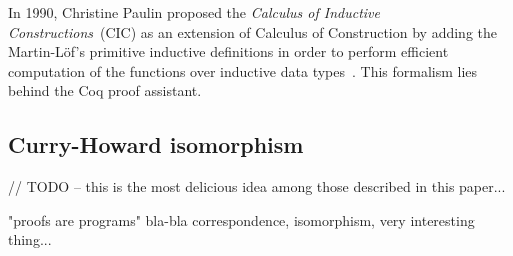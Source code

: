 \documentclass[article]{aaltoseries}
\begin{document}
In 1990, Christine Paulin proposed the \textit{Calculus of Inductive Constructions}~(CIC) as an extension of Calculus of Construction by adding the Martin-Löf's primitive inductive definitions in order to perform efficient computation of the functions over inductive data types~\cite{Pau2015}. This formalism lies behind the Coq proof assistant.



\subsection{Curry-Howard isomorphism}
// TODO -- this is the most delicious idea among those described in this paper...

"proofs are programs"
bla-bla correspondence, isomorphism, very interesting thing...




		


\end{document}
